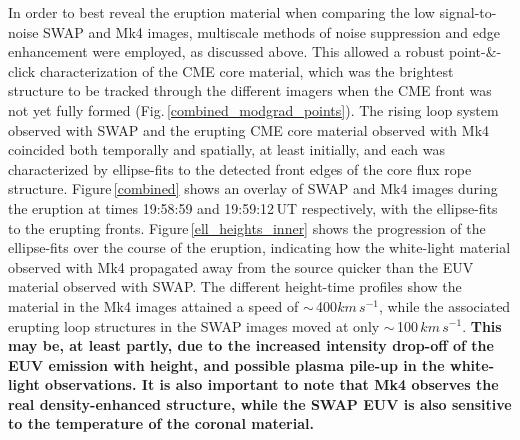 \documentclass[namedreferences]{solarphysics}
\begin{document}
\begin{article}
In order to best reveal the eruption material when comparing the low signal-to-noise SWAP and Mk4 images, multiscale methods of noise suppression and edge enhancement were employed, as discussed above. This allowed a robust point-\&-click characterization of the CME core material, which was the brightest structure to be tracked through the different imagers when the CME front was not yet fully formed (Fig.\,\ref{combined_modgrad_points}). The rising loop system observed with SWAP and the erupting CME core material observed with Mk4 coincided both temporally and spatially, at least initially, and each was characterized by ellipse-fits to the detected front edges of the core flux rope structure. Figure\,\ref{combined} shows an overlay of SWAP and Mk4 images during the eruption at times 19:58:59 and 19:59:12\,UT respectively, with the ellipse-fits to the erupting fronts. Figure\,\ref{ell_heights_inner} shows the progression of the ellipse-fits over the course of the eruption, indicating how the white-light material observed with Mk4 propagated away from the source quicker than the EUV material observed with SWAP. The different height-time profiles show the material in the Mk4 images attained a speed of $\sim$\,400$km\,s^{-1}$, while the associated erupting loop structures in the SWAP images moved at only $\sim$\,100$\,km\,s^{-1}$. {\bf This may be, at least partly, due to the increased intensity drop-off of the EUV emission with height, and possible plasma pile-up in the white-light observations. It is also important to note that Mk4 observes the real density-enhanced structure, while the SWAP EUV is also sensitive to the temperature of the coronal material.} %



\end{article}
\end{document}
